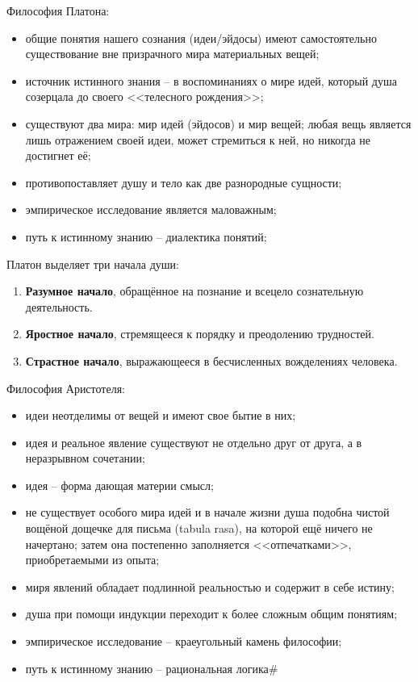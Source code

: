 
Философия Платона:
\begin{itemize}
    \item общие понятия нашего сознания (идеи/эйдосы) имеют самостоятельно существование вне призрачного мира 
        материальных вещей;
    \item источник истинного знания -- в воспоминаниях о мире идей, который душа созерцала до своего 
        <<телесного рождения>>;
    \item существуют два мира: мир идей (эйдосов) и мир вещей; любая вещь является лишь отражением своей 
        идеи, может стремиться к ней, но никогда не достигнет её;
    \item противопоставляет душу и тело как две разнородные сущности;
    \item эмпирическое исследование является маловажным;
    \item путь к истинному знанию -- диалектика понятий;
\end{itemize}

Платон выделяет три начала души:
\begin{enumerate}
    \item \textbf{Разумное начало}, обращённое на познание и всецело сознательную деятельность.
    \item \textbf{Яростное начало}, стремящееся к порядку и преодолению трудностей.
    \item \textbf{Страстное начало}, выражающееся в бесчисленных вожделениях человека.
\end{enumerate}

Философия Аристотеля:
\begin{itemize}
    \item идеи неотделимы от вещей и имеют свое бытие в них;
    \item идея и реальное явление существуют не отдельно друг от друга, а в неразрывном сочетании;
    \item идея -- форма дающая материи смысл;
    \item не существует особого мира идей и в начале жизни душа подобна чистой вощёной дощечке для письма 
        (tabula rasa), на которой ещё ничего не начертано; затем она постепенно заполняется <<отпечатками>>, 
        приобретаемыми из опыта;
    \item миря явлений обладает подлинной реальностью и содержит в себе истину;
    \item душа при помощи индукции переходит к более сложным общим понятиям;
    \item эмпирическое исследование -- краеугольный камень философии;
    \item путь к истинному знанию -- рациональная логика#
\end{itemize}

